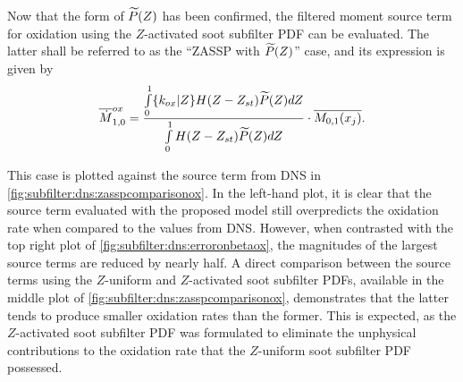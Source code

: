 Now that the form of $\pz$ has been confirmed, the filtered moment source term for oxidation using the $Z$-activated soot subfilter PDF can be evaluated. The latter shall be referred to as the ``ZASSP with $\pz$'' case, and its expression is given by
\begin{equation}\label{eq:subfilter:dns:mzasspwithpz}
  \fst[M]{1,0}^{ox} = \frac{\int\limits_0^1 \{ k_{ox}|Z \}H(Z - Z_{st})\pz dZ}{\int\limits_0^1 H(Z - Z_{st})\pz dZ} \cdot \mean{M_{0,1}(x_j)}.
\end{equation}

This case is plotted against the source term from DNS in \cref{fig:subfilter:dns:zasspcomparisonox}. In the left-hand plot, it is clear that the source term evaluated with the proposed model still overpredicts the oxidation rate when compared to the values from DNS. However, when contrasted with the top right plot of \cref{fig:subfilter:dns:erroronbetaox}, the magnitudes of the largest source terms are reduced by nearly half. A direct comparison between the source terms using the $Z$-uniform and $Z$-activated soot subfilter PDFs, available in the middle plot of \cref{fig:subfilter:dns:zasspcomparisonox}, demonstrates that the latter tends to produce smaller oxidation rates than the former. This is expected, as the $Z$-activated soot subfilter PDF was formulated to eliminate the unphysical contributions to the oxidation rate that the $Z$-uniform soot subfilter PDF possessed.

